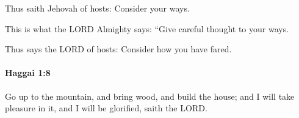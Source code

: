 			\begin{versebox}
					\item[BHS] 
					\item[LXX] 
					\item[ASV] Thus saith Jehovah of hosts: Consider your ways.
					\item[NIV] This is what the LORD Almighty says: “Give careful thought to your ways.
					\item[NRSV] Thus says the LORD of hosts: Consider how you have fared.
			\end{versebox}

		\paragraph{Haggai 1:8} %
			\label{HAGGAI-1-8}

			Go up to the mountain, and bring wood, and build the house; and I will take pleasure in it, and I will be glorified, saith the LORD.

